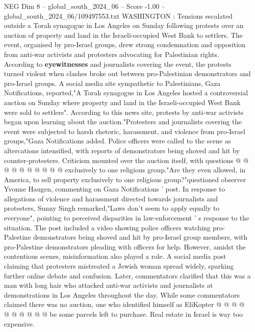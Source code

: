 \begin{textsample}{NEG Dim 8 – global\_south\_2024\_06 – Score -1.00 – global\_south\_2024\_06/109497553.txt}  \label{ex:f8_neg_243}
WASHINGTON : Tensions escalated outside a Torah synagogue in Los Angeles on Sunday following protests over an auction of property and land in the Israeli-occupied West Bank to settlers.
The event, organised by pro-Israel groups, drew strong condemnation and opposition from anti-war activists and protesters advocating for Palestinian rights.
According to \textbf{eyewitnesses} and journalists covering the event, the protests turned violent when clashes broke out between pro-Palestinian demonstrators and pro-Israel groups.
A social media site sympathetic to Palestinians, Gaza Notifications, reported,"A Torah synagogue in Los Angeles hosted a controversial auction on Sunday where property and land in the Israeli-occupied West Bank were sold to settlers".
According to this news site, protests by anti-war activists began upon learning about the auction."Protesters and journalists covering the event were subjected to harsh rhetoric, harassment, and violence from pro-Israel groups,"Gaza Notifications added.
Police officers were called to the scene as altercations intensified, with reports of demonstrators being shoved and hit by counter-protesters.
Criticism mounted over the auction itself, with questions @ @ @ @ @ @ @ @ @ @ exclusively to one religious group."Are they even allowed, in America, to sell property exclusively to one religious group?"questioned observer Yvonne Haugen, commenting on Gaza Notifications ' post.
In response to allegations of violence and harassment directed towards journalists and protesters, Sunny Singh remarked,"Laws don't seem to apply equally to everyone", pointing to perceived disparities in law-enforcement ' s response to the situation.
The post included a video showing police officers watching pro-Palestine demonstrators being shoved and hit by pro-Israel group members, with pro-Palestine demonstrators pleading with officers for help.
However, amidst the contentious scenes, misinformation also played a role.
A social media post claiming that protesters mistreated a Jewish woman spread widely, sparking further online debate and confusion.
Later, commentators clarified that this was a man with long hair who attacked anti-war activists and journalists at demonstrations in Los Angeles throughout the day.
While some commentators claimed there was no auction, one who identified himself as EliKopter @ @ @ @ @ @ @ @ @ @ be some parcels left to purchase.
Real estate in Israel is way too expensive.

\end{textsample}

